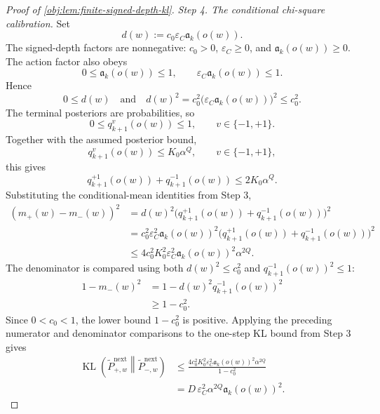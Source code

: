 \documentclass[11pt]{article}
\begin{document}
\begin{proof}[Proof of \cref{obj:lem:finite-signed-depth-kl}]
\emph{Step 4. The conditional chi-square calibration.}
Set
\[
d(w):=c_0\varepsilon_C\mathfrak a_k(o(w)).
\]
The signed-depth factors are nonnegative: \(c_0>0\), \(\varepsilon_C\ge 0\), and \(\mathfrak a_k(o(w))\ge 0\).  The action factor also obeys
\[
0\le \mathfrak a_k(o(w))\le 1,
\qquad
\varepsilon_C\mathfrak a_k(o(w))\le 1.
\]
Hence
\[
0\le d(w)
\quad\text{and}\quad
 d(w)^2
=c_0^2\bigl(\varepsilon_C\mathfrak a_k(o(w))\bigr)^2
\le c_0^2.
\]
The terminal posteriors are probabilities, so
\[
0\le q_{k+1}^{v}(o(w))\le 1,
\qquad v\in\{-1,+1\}.
\]
Together with the assumed posterior bound,
\[
q_{k+1}^{v}(o(w))\le K_0\alpha^Q,
\qquad v\in\{-1,+1\},
\]
this gives
\[
q_{k+1}^{+1}(o(w))+q_{k+1}^{-1}(o(w))
\le 2K_0\alpha^Q.
\]
Substituting the conditional-mean identities from Step 3,
\[
\begin{aligned}
(m_+(w)-m_-(w))^2
&=d(w)^2\bigl(q_{k+1}^{+1}(o(w))+q_{k+1}^{-1}(o(w))\bigr)^2  \\
&=c_0^2\varepsilon_C^2\mathfrak a_k(o(w))^2
\bigl(q_{k+1}^{+1}(o(w))+q_{k+1}^{-1}(o(w))\bigr)^2 \\
&\le
4c_0^2K_0^2\varepsilon_C^2\mathfrak a_k(o(w))^2\alpha^{2Q}.
\end{aligned}
\]
The denominator is compared using both \(d(w)^2\le c_0^2\) and \(q_{k+1}^{-1}(o(w))^2\le 1\):
\[
\begin{aligned}
1-m_-(w)^2
&=1-d(w)^2q_{k+1}^{-1}(o(w))^2 \\
&\ge 1-c_0^2.
\end{aligned}
\]
Since \(0<c_0<1\), the lower bound \(1-c_0^2\) is positive.  Applying the preceding numerator and denominator comparisons to the one-step KL bound from Step 3 gives
\[
\begin{aligned}
\operatorname{KL}\!\left(\widetilde P_{+,w}^{\mathrm{next}}\middle\|\widetilde P_{-,w}^{\mathrm{next}}\right)
&\le
\frac{4c_0^2K_0^2\varepsilon_C^2\mathfrak a_k(o(w))^2\alpha^{2Q}}{1-c_0^2} \\
&=
D\,\varepsilon_C^2\alpha^{2Q}\mathfrak a_k(o(w))^2 .
\end{aligned}
\] %


\end{proof}
\end{document}
